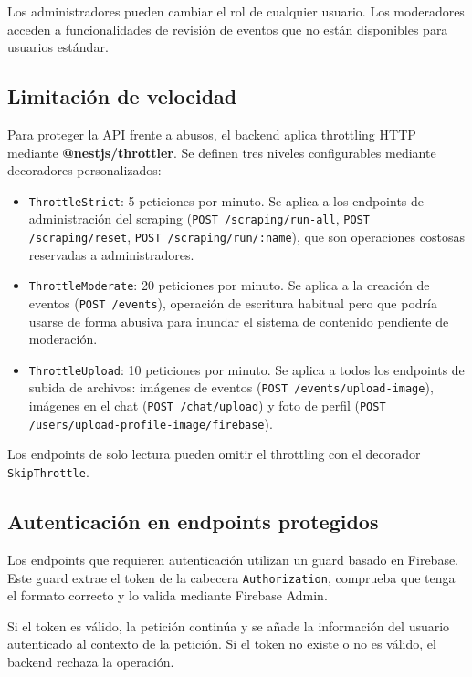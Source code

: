 Los administradores pueden cambiar el rol de cualquier usuario. Los moderadores acceden a funcionalidades de revisión de eventos que no están disponibles para usuarios estándar.

\subsection{Limitación de velocidad}

Para proteger la API frente a abusos, el backend aplica throttling HTTP mediante \textbf{@nestjs/throttler}. Se definen tres niveles configurables mediante decoradores personalizados:

\begin{itemize}
    \item \texttt{ThrottleStrict}: 5 peticiones por minuto. Se aplica a los endpoints de administración del scraping (\texttt{POST /scraping/run-all}, \texttt{POST /scraping/reset}, \texttt{POST /scraping/run/:name}), que son operaciones costosas reservadas a administradores.
    \item \texttt{ThrottleModerate}: 20 peticiones por minuto. Se aplica a la creación de eventos (\texttt{POST /events}), operación de escritura habitual pero que podría usarse de forma abusiva para inundar el sistema de contenido pendiente de moderación.
    \item \texttt{ThrottleUpload}: 10 peticiones por minuto. Se aplica a todos los endpoints de subida de archivos: imágenes de eventos (\texttt{POST /events/upload-image}), imágenes en el chat (\texttt{POST /chat/upload}) y foto de perfil (\texttt{POST /users/upload-profile-image/firebase}).
\end{itemize}

Los endpoints de solo lectura pueden omitir el throttling con el decorador \texttt{SkipThrottle}.

\subsection{Autenticación en endpoints protegidos}

Los endpoints que requieren autenticación utilizan un guard basado en Firebase. Este guard extrae el token de la cabecera \texttt{Authorization}, comprueba que tenga el formato correcto y lo valida mediante Firebase Admin.

Si el token es válido, la petición continúa y se añade la información del usuario autenticado al contexto de la petición. Si el token no existe o no es válido, el backend rechaza la operación.

